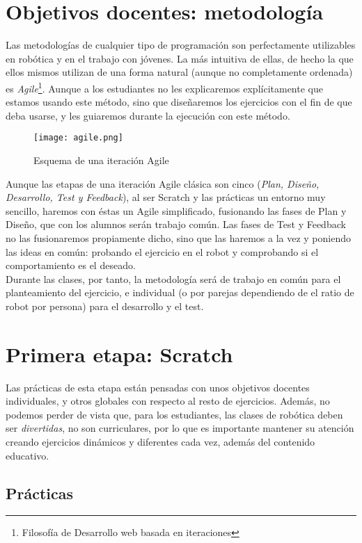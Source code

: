 \section{Objetivos docentes: metodología}\label{sec:metodología}
Las metodologías de cualquier tipo de programación son perfectamente utilizables en robótica y en el trabajo con jóvenes. La más intuitiva de ellas, de hecho la que ellos mismos utilizan de una forma natural (aunque no completamente ordenada) es \textit{Agile}\footnote{Filosofía de Desarrollo web basada en iteraciones}. Aunque a los estudiantes no les explicaremos explícitamente que estamos usando este método, sino que diseñaremos los ejercicios con el fin de que deba usarse, y les guiaremos durante la ejecución con este método. 
\begin{figure}[h]
	\centering
	\texttt{[image: agile.png]}
	\label{img:agile}
	\caption{Esquema de una iteración Agile}
\end{figure}
Aunque las etapas de una iteración Agile clásica son cinco (\textit{Plan, Diseño, Desarrollo, Test y Feedback}), al ser Scratch y las prácticas un entorno muy sencillo, haremos con éstas un Agile simplificado, fusionando las fases de Plan y Diseño, que con los alumnos serán trabajo común. Las fases de Test y Feedback no las fusionaremos propiamente dicho, sino que las haremos a la vez y poniendo las ideas en común: probando el ejercicio en el robot y comprobando si el comportamiento es el deseado. \\
Durante las clases, por tanto, la metodología será de trabajo en común para el planteamiento del ejercicio, e individual (o por parejas dependiendo de el ratio de robot por persona) para el desarrollo y el test.
\section{Primera etapa: Scratch}\label{sec:scratch}
Las prácticas de esta etapa están pensadas con unos objetivos docentes individuales, y otros globales con respecto al resto de ejercicios. Además, no podemos perder de vista que, para los estudiantes, las clases de robótica deben ser \textit{divertidas}, no son curriculares, por lo que es importante mantener su atención creando ejercicios dinámicos y diferentes cada vez, además del contenido educativo. 
\subsection{Prácticas}\label{subsec:practicas}

